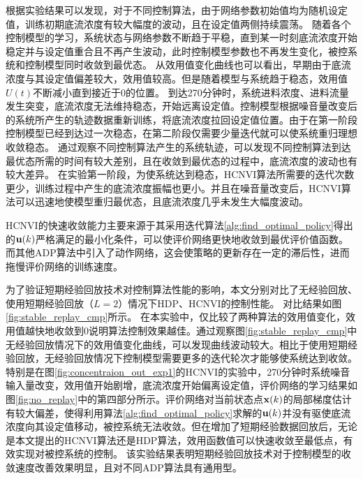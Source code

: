 根据实验结果可以发现，对于不同控制算法，由于网络参数初始值均为随机设定值，训练初期底流浓度有较大幅度的波动，且在设定值两侧持续震荡。
随着各个控制模型的学习，系统状态与网络参数不断趋于平稳，直到某一时刻底流浓度开始稳定并与设定值重合且不再产生波动，此时控制模型参数也不再发生变化，被控系统和控制模型同时收敛到最优态。
从效用值变化曲线也可以看出，早期由于底流浓度与其设定值偏差较大，效用值较高。但是随着模型与系统趋于稳态，效用值${U}(t)$不断减小直到接近于0的位置。
%
到达270分钟时，系统进料浓度、进料流量发生突变，底流浓度无法维持稳态，开始远离设定值。控制模型根据噪音量改变后的系统所产生的轨迹数据重新训练，将底流浓度拉回设定值位置。由于在第一阶段控制模型已经到达过一次稳态，在第二阶段仅需要少量迭代就可以使系统重归理想收敛稳态。
通过观察不同控制算法产生的系统轨迹，可以发现不同控制算法到达最优态所需的时间有较大差别，且在收敛到最优态的过程中，底流浓度的波动也有较大差异。
在实验第一阶段，为使系统达到稳态，HCNVI算法所需要的迭代次数更少，训练过程中产生的底流浓度振幅也更小。并且在噪音量改变后，HCNVI算法可以迅速地使模型重归最优态，且底流浓度几乎未发生大幅度波动。

HCNVI的快速收敛能力主要来源于其采用迭代算法\ref{alg:find_optimal_policy}得出的${\mathbf
u}(k)$严格满足的最小化条件，可以使评价网络更快地收敛到最优评价值函数。而其他ADP算法中引入了动作网络，这会使策略的更新存在一定的滞后性，进而拖慢评价网络的训练速度。

为了验证短期经验回放技术对控制算法性能的影响，本文分别对比了无经验回放、使用短期经验回放（$L=2$）情况下HDP、HCNVI的控制性能。
对比结果如图\ref{fig:stable_replay_cmp}所示。
在本实验中，仅比较了两种算法的效用值变化，效用值越快地收敛到0说明算法控制效果越佳。通过观察图\ref{fig:stable_replay_cmp}中无经验回放情况下的效用值变化曲线，可以发现曲线波动较大。相比于使用短期经验回放，无经验回放情况下控制模型需要更多的迭代轮次才能够使系统达到收敛。
特别是在图\ref{fig:concentraion_out_exp1}的HCNVI的实验中，270分钟时系统噪音输入量改变，效用值开始剧增，底流浓度开始偏离设定值，评价网络的学习结果如图\ref{fig:no_replay}中的第四部分所示。评价网络对当前状态点$\mathbf
x(k)$的局部梯度估计有较大偏差，使得利用算法\ref{alg:find_optimal_policy}求解的${\mathbf u}(k)$并没有驱使底流浓度向其设定值移动，被控系统无法收敛。但在增加了短期经验数据回放后，无论是本文提出的HCNVI算法还是HDP算法，效用函数值可以快速收敛至最低点，有效实现对被控系统的控制。
该实验结果表明短期经验回放技术对于控制模型的收敛速度改善效果明显，且对不同ADP算法具有通用型。


